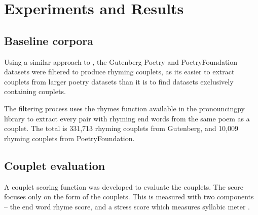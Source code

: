 \documentclass[11pt,a4paper]{article}
\begin{document}
\section{Experiments and Results}
\label{sec:results}

\subsection{Baseline corpora}
\label{sec:corpora}

Using a similar approach to \citet{cole}, the Gutenberg Poetry \cite{gutenbergpoetry} and PoetryFoundation \cite{poetryfoundationkaggle} datasets were filtered to produce rhyming couplets, as its easier to extract couplets from larger poetry datasets than it is to find datasets exclusively containing couplets.

The filtering process uses the rhymes function available in the pronouncingpy library to extract every pair with rhyming end words from the same poem as a couplet. The total is 331,713 rhyming couplets from Gutenberg, and 10,009 rhyming couplets from PoetryFoundation.

\subsection{Couplet evaluation}
\label{sec:coupleteval}

A couplet scoring function was developed to evaluate the couplets. The score focuses only on the form of the couplets. This is measured with two components -- the end word rhyme score, and a stress score which measures syllabic meter \cite{meter_def}.
\end{document}
